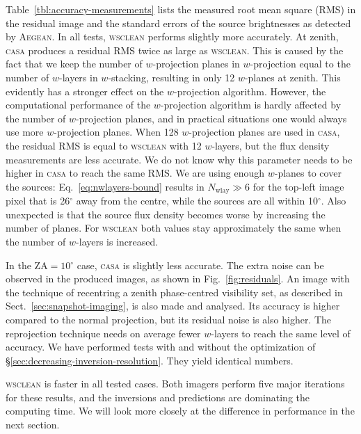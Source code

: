 \documentclass[useAMS,usenatbib]{mn2e}
\newcommand{\degree}{\ensuremath{^{\circ}}\xspace}
\begin{document}
Table~\ref{tbl:accuracy-measurements} lists the measured root mean square (RMS) in the residual image and the standard errors of the source brightnesses as detected by \textsc{Aegean}. In all tests, \textsc{wsclean} performs slightly more accurately. At zenith, \textsc{casa} produces a residual RMS twice as large as \textsc{wsclean}. This is caused by the fact that we keep the number of $w$-projection planes in $w$-projection equal to the number of $w$-layers in $w$-stacking, resulting in only 12 $w$-planes at zenith. This evidently has a stronger effect on the $w$-projection algorithm. However, the computational performance of the $w$-projection algorithm is hardly affected by the number of $w$-projection planes, and in practical situations one would always use more $w$-projection planes. When 128 $w$-projection planes are used in \textsc{casa}, the residual RMS is equal to \textsc{wsclean} with 12 $w$-layers, but the flux density measurements are less accurate. We do not know why this parameter needs to be higher in \textsc{casa} to reach the same RMS. We are using enough $w$-planes to cover the sources: Eq.~\eqref{eq:nwlayers-bound} results in $N_\textrm{wlay}\gg 6$ for the top-left image pixel that is 26\degree away from the centre, while the sources are all within 10\degree. Also unexpected is that the source flux density becomes worse by increasing the number of planes. For \textsc{wsclean} both values stay approximately the same when the number of $w$-layers is increased.

In the $\textrm{ZA}=10\degree$ case, \textsc{casa} is slightly less accurate. The extra noise can be observed in the produced images, as shown in Fig.~\ref{fig:residuals}. An image with the technique of recentring a zenith phase-centred visibility set, as described in Sect.~\ref{sec:snapshot-imaging}, is also made and analysed. Its accuracy is higher compared to the normal projection, but its residual noise is also higher. The reprojection technique needs on average fewer $w$-layers to reach the same level of accuracy. We have performed tests with and without the optimization of \S\ref{sec:decreasing-inversion-resolution}. They yield identical numbers.

\textsc{wsclean} is faster in all tested cases. Both imagers perform five major iterations for these results, and the inversions and predictions are dominating the computing time. We will look more closely at the difference in performance in the next section.
\end{document}
